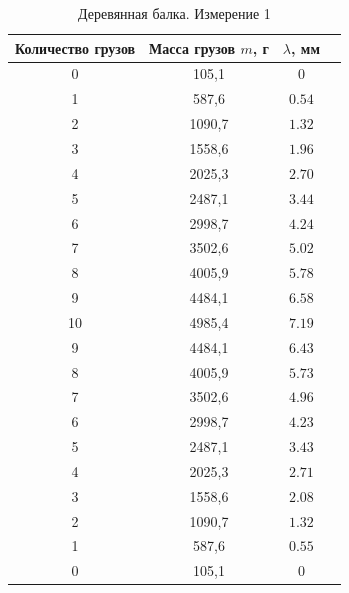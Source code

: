 \documentclass{article}
\begin{document}
\begin{table}[!t]
    \centering
    \begin{tabular}{|c|c|c|c|}
        \hline
         Количество грузов & Масса грузов $m$, г & $\lambda$, мм  \\
         \hline
        0  & 105,1  & 0                 \\
        1  & 587,6  & $0.54$  \\
        2  & 1090,7 & $1.32$ \\
        3  & 1558,6 & $1.96$ \\
        4  & 2025,3 & $2.70$ \\
        5  & 2487,1 & $3.44$ \\
        6  & 2998,7 & $4.24$ \\
        7  & 3502,6 & $5.02$ \\
        8  & 4005,9 & $5.78$ \\
        9  & 4484,1 & $6.58$ \\
        10 & 4985,4 & $7.19$ \\
        9  & 4484,1 & $6.43$ \\
        8  & 4005,9 & $5.73$ \\
        7  & 3502,6 & $4.96$ \\
        6  & 2998,7 & $4.23$ \\
        5  & 2487,1 & $3.43$ \\
        4  & 2025,3 & $2.71$ \\
        3  & 1558,6 & $2.08$ \\
        2  & 1090,7 & $1.32$ \\
        1  & 587,6  & $0.55$  \\
        0  & 105,1  & 0                 \\
        \hline
    \end{tabular}
    \caption{Деревянная балка. Измерение 1}
\end{table}
\end{document}
